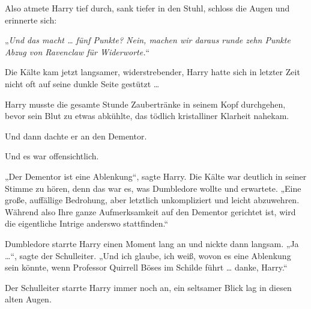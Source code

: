 Also atmete Harry tief durch, sank tiefer in den Stuhl, schloss die Augen und erinnerte sich:

„\emph{Und das macht … fünf Punkte? Nein, machen wir daraus runde zehn Punkte Abzug von Ravenclaw für Widerworte.}“

Die Kälte kam jetzt langsamer, widerstrebender, Harry hatte sich in letzter Zeit nicht oft auf seine dunkle Seite gestützt …

Harry musste die gesamte Stunde Zaubertränke in seinem Kopf durchgehen, bevor sein Blut zu etwas abkühlte, das tödlich kristalliner Klarheit nahekam.

Und dann dachte er an den Dementor.

Und es war offensichtlich.

„Der Dementor ist eine Ablenkung“, sagte Harry. Die Kälte war deutlich in seiner Stimme zu hören, denn das war es, was Dumbledore wollte und erwartete.
„Eine große, auffällige Bedrohung, aber letztlich unkompliziert und leicht abzuwehren. Während also Ihre ganze Aufmerksamkeit auf den Dementor gerichtet ist, wird die eigentliche Intrige anderswo stattfinden.“

Dumbledore starrte Harry einen Moment lang an und nickte dann langsam.
„Ja …“, sagte der Schulleiter.
„Und ich glaube, ich weiß, wovon es eine Ablenkung sein könnte, wenn Professor Quirrell Böses im Schilde führt … danke, Harry.“

Der Schulleiter starrte Harry immer noch an, ein seltsamer Blick lag in diesen alten Augen.

